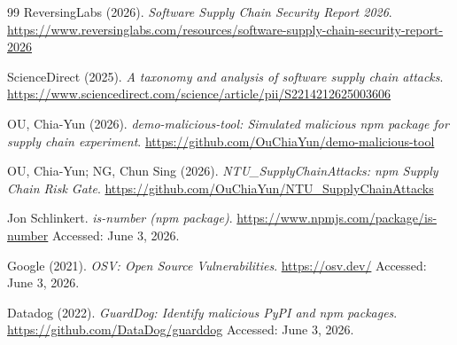 \documentclass[12pt,a4paper]{article}
\begin{document}
\begin{thebibliography}{99}
ReversingLabs (2026).
\textit{Software Supply Chain Security Report 2026}.
\url{https://www.reversinglabs.com/resources/software-supply-chain-security-report-2026}

ScienceDirect (2025).
\textit{A taxonomy and analysis of software supply chain attacks}.
\url{https://www.sciencedirect.com/science/article/pii/S2214212625003606}

OU, Chia-Yun (2026).
\textit{demo-malicious-tool: Simulated malicious npm package for supply chain experiment}.
\url{https://github.com/OuChiaYun/demo-malicious-tool}

OU, Chia-Yun; NG, Chun Sing (2026).
\textit{NTU\_SupplyChainAttacks: npm Supply Chain Risk Gate}.
\url{https://github.com/OuChiaYun/NTU_SupplyChainAttacks}

Jon Schlinkert.
\textit{is-number (npm package)}.
\url{https://www.npmjs.com/package/is-number}
Accessed: June 3, 2026.

Google (2021).
\textit{OSV: Open Source Vulnerabilities}.
\url{https://osv.dev/}
Accessed: June 3, 2026.

Datadog (2022).
\textit{GuardDog: Identify malicious PyPI and npm packages}.
\url{https://github.com/DataDog/guarddog}
Accessed: June 3, 2026.

\end{thebibliography}
\end{document}
